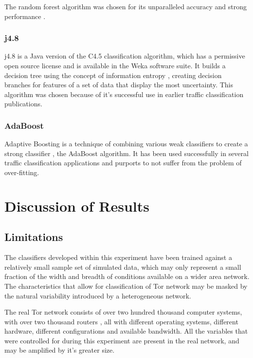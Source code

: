 The random forest algorithm was chosen for its unparalleled accuracy and strong
performance \parencite{Leo-Breiman:2004fk}.

\subsection{j4.8}

j4.8 is a Java version of the C4.5 classification algorithm, which has a
permissive open source license and is available in the Weka software suite. It
builds a decision tree using the concept of information entropy
\parencite{Quinlan:1993:CPM:152181}, creating decision branches for features of
a set of data that display the most uncertainty. This algorithm was chosen
because of it's successful use in earlier traffic classification publications.

\subsection{AdaBoost}

Adaptive Boosting is a technique of combining various weak classifiers to
create a strong classifier \parencite{Schapire:1999uq}, the AdaBoost algorithm.
It has been used successfully in several traffic classification applications
\parencite{Alshammari:2009p7474,Haffner:2005p3822,Mohd:2009p6484} and purports
to not suffer from the problem of over-fitting.

\chapter{Discussion of Results}

\section{Limitations}

The classifiers developed within this experiment have been trained against
a relatively small sample set of simulated data, which may only represent
a small fraction of the width and breadth of conditions available on a wider
area network. The characteristics that allow for classification of Tor network
may be masked by the natural variability introduced by a heterogeneous network.

The real Tor network consists of over two hundred thousand computer systems,
with over two thousand routers \parencite{TorStatus:2011fk}, all with different
operating systems, different hardware, different configurations and available
bandwidth. All the variables that were controlled for during this experiment
are present in the real network, and may be amplified by it's greater size.

